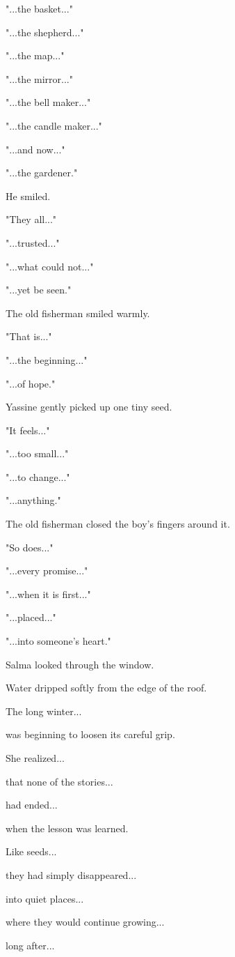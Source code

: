 \documentclass[12pt,openany]{book}
\begin{document}
"...the basket..."

"...the shepherd..."

"...the map..."

"...the mirror..."

"...the bell maker..."

"...the candle maker..."

"...and now..."

"...the gardener."

He smiled.

"They all..."

"...trusted..."

"...what could not..."

"...yet be seen."

The old fisherman smiled warmly.

"That is..."

"...the beginning..."

"...of hope."

Yassine gently picked up one tiny seed.

"It feels..."

"...too small..."

"...to change..."

"...anything."

The old fisherman closed the boy's fingers around it.

"So does..."

"...every promise..."

"...when it is first..."

"...placed..."

"...into someone's heart."

Salma looked through the window.

Water dripped softly from the edge of the roof.

The long winter...

was beginning to loosen its careful grip.

She realized...

that none of the stories...

had ended...

when the lesson was learned.

Like seeds...

they had simply disappeared...

into quiet places...

where they would continue growing...

long after...
\end{document}
